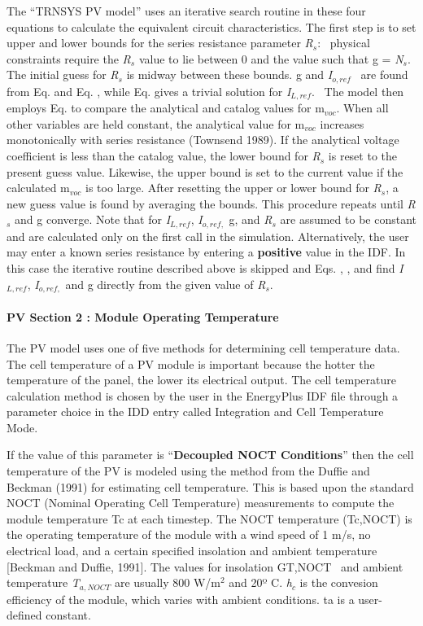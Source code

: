 The ``TRNSYS PV model'' uses an iterative search routine in these four equations to calculate the equivalent circuit characteristics. The first step is to set upper and lower bounds for the series resistance parameter \emph{R\(_{s}\)}:~ physical constraints require the \emph{R\(_{s}\)} value to lie between 0 and the value such that g = \emph{N\(_{s}\)}. The initial guess for \emph{R\(_{s}\)} is midway between these bounds. g and \emph{I\(_{o,ref}\)} ~are found from Eq. and Eq. , while Eq. gives a trivial solution for \emph{I\(_{L,ref}\)}.~ The model then employs Eq. to compare the analytical and catalog values for m\(_{voc}\). When all other variables are held constant, the analytical value for m\(_{voc}\) increases monotonically with series resistance (Townsend 1989). If the analytical voltage coefficient is less than the catalog value, the lower bound for \emph{R\(_{s}\)} is reset to the present guess value. Likewise, the upper bound is set to the current value if the calculated m\(_{voc}\) is too large. After resetting the upper or lower bound for \emph{R\(_{s}\)}, a new guess value is found by averaging the bounds. This procedure repeats until \emph{R\(_{s}\)} and g converge. Note that for \emph{I\(_{L,ref}\)}, \emph{I\(_{o,ref,}\)} g, and \emph{R\(_{s}\)} are assumed to be constant and are calculated only on the first call in the simulation. Alternatively, the user may enter a known series resistance by entering a \textbf{positive} value in the IDF. In this case the iterative routine described above is skipped and Eqs. , , and find \emph{I\(_{L,ref}\)}, \emph{I\(_{o,ref,}\)} and g directly from the given value of \emph{R\(_{s}\)}.

\paragraph{PV Section 2 : Module Operating Temperature}\label{pv-section-2-module-operating-temperature}

The PV model uses one of five methods for determining cell temperature data. The cell temperature of a PV module is important because the hotter the temperature of the panel, the lower its electrical output. The cell temperature calculation method is chosen by the user in the EnergyPlus IDF file through a parameter choice in the IDD entry called Integration and Cell Temperature Mode.

If the value of this parameter is ``\textbf{Decoupled NOCT Conditions}'' then the cell temperature of the PV is modeled using the method from the Duffie and Beckman (1991) for estimating cell temperature. This is based upon the standard NOCT (Nominal Operating Cell Temperature) measurements to compute the module temperature Tc at each timestep. The NOCT temperature (Tc,NOCT) is the operating temperature of the module with a wind speed of 1 m/s, no electrical load, and a certain specified insolation and ambient temperature {[}Beckman and Duffie, 1991{]}. The values for insolation GT,NOCT ~and ambient temperature \emph{T\(_{a,NOCT}\)} are usually 800 W/m\(^{2}\) and 20º C. \emph{h\(_{c}\)} is the convesion efficiency of the module, which varies with ambient conditions. ta is a user-defined constant.

